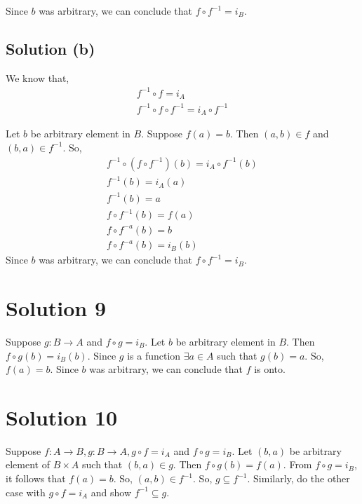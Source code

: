 \documentclass{article}
\begin{document}
Since $b$ was arbitrary, we can conclude that $f \circ f^{-1} = i_B$.

\subsection{Solution (b)}
We know that,
\begin{align*}
  f^{-1} \circ f = i_A \\
  f^{-1} \circ f \circ f^{-1} = i_A \circ f^{-1} 
\end{align*}

Let $b$ be arbitrary element in $B$. Suppose $f(a) = b$. Then $(a,b)
\in f$ and $(b,a) \in f^{-1}$. So,
\begin{align*}
  f^{-1} \circ (f \circ f^{-1})(b) = i_A \circ f^{-1}(b) \\
  f^{-1}(b) = i_A(a) \\
  f^{-1}(b) = a \\
  f \circ f^{-1}(b) = f(a) \tag{Apply f} \\
  f \circ f^{-a} (b) = b \\
  f \circ f^{-a} (b) = i_B(b)
\end{align*}
Since $b$ was arbitrary, we can conclude that $f \circ f^{-1} = i_B$.

\section{Solution 9}
Suppose $g: B \to A$ and $f \circ g = i_B$. Let $b$ be arbitrary
element in $B$. Then $f \circ g(b) = i_B(b)$. Since $g$ is a function
$\exists a \in A$ such that $g(b) = a$. So, $f(a) = b$. Since $b$ was
arbitrary, we can conclude that $f$ is onto.

\section{Solution 10}
Suppose $f: A \to B, g: B \to A, g \circ f = i_A$ and $f \circ g =
i_B$. Let $(b,a)$ be arbitrary element of $B \times A$ such that
$(b,a) \in g$. Then $f \circ g(b) = f(a)$. From $f \circ g = i_B$, it
follows that $f(a) = b$. So, $(a,b) \in f^{-1}$. So, $g \subseteq
f^{-1}$. Similarly, do the other case with $g \circ f = i_A$ and show
$f^{-1} \subseteq g$.
\end{document}
